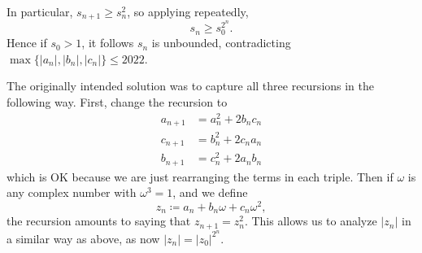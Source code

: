\documentclass[11pt]{scrartcl}
\begin{document}
In particular, $s_{n+1} \ge s_n^2$, so applying repeatedly,
\[ s_n \ge s_0^{2^n}. \]
Hence if $s_0 > 1$, it follows $s_n$ is unbounded, contradicting
$\max{\{|a_n|, |b_n|, |c_n|\}} \leq 2022$.

\begin{remark*}
The originally intended solution was to capture all three
recursions in the following way.
First, change the recursion to
\begin{align*}
  a_{n+1} &= a_n^2 + 2b_nc_n \\
  c_{n+1} &= b_n^2 + 2c_na_n \\
  b_{n+1} &= c_n^2 + 2a_nb_n
\end{align*}
which is OK because we are just rearranging the terms in each triple.
Then if $\omega$ is any complex number with $\omega^3 = 1$, and we define
\[ z_n \coloneqq a_n + b_n \omega + c_n \omega^2, \]
the recursion amounts to saying that $z_{n+1} = z_n^2$.
This allows us to analyze $|z_n|$ in a similar way as above,
as now $|z_n| = |z_0|^{2^n}$.
\end{remark*}
\pagebreak
\end{document}
